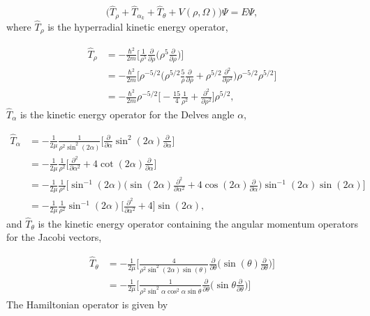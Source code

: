 \documentclass{article}
\begin{document}
\begin{equation}
\big(\hat{T}_{\rho} + \hat{T}_{\alpha_{k}} + \hat{T}_{\theta} + V(\rho,\Omega)\big) \Psi = E\Psi, 
\end{equation}
where $\hat{T}_{\rho}$ is the hyperradial kinetic energy operator,

\begin{align}
\hat{T}_{\rho} &= -\frac{\hbar^2}{2m} \Big[ \frac{1}{\rho^5}\frac{\partial}{\partial\rho} \Big( \rho^5 \frac{\partial}{\partial\rho} \Big)  \Big] \nonumber\\ 
&= -\frac{\hbar^2}{2m} \Big[ \rho^{-5/2} \Big( \rho^{5/2} \frac{5}{\rho} \frac{\partial}{\partial\rho} + \rho^{5/2} \frac{\partial^2}{\partial\rho^2} \Big) \rho^{-5/2} \rho^{5/2} \Big]\nonumber\\
&= -\frac{\hbar^2}{2m} \rho^{-5/2} \Big[  -\frac{15}{4} \frac{1}{\rho^2} + \frac{\partial^2}{\partial\rho^2} \Big] \rho^{5/2},
\end{align}
$\hat{T}_{\alpha}$ is the kinetic energy operator for the Delves angle $\alpha$,

\begin{align}
\hat{T}_{\alpha} &= -\frac{1}{2\mu}  \frac{1}{\rho^2 \sin^2(2\alpha)}  \bigg[ \frac{\partial}{\partial\alpha} \sin^2(2\alpha) \frac{\partial}{\partial\alpha} \bigg]\nonumber\\ 
&= -\frac{1}{2\mu} \frac{1}{\rho^2} \bigg[ \frac{\partial^2}{\partial\alpha^2} + 4\cot(2\alpha) \frac{\partial}{\partial\alpha} \bigg]\nonumber\\
&= -\frac{1}{2\mu} \frac{1}{\rho^2} \bigg[ \sin^{-1}(2\alpha) \bigg(\sin(2\alpha)\frac{\partial^2}{\partial\alpha^2} + 4\cos(2\alpha) \frac{\partial}{\partial\alpha} \bigg) \sin^{-1}(2\alpha) \sin(2\alpha) \bigg]\nonumber\\
&= -\frac{1}{2\mu} \frac{1}{\rho^2}\sin^{-1}(2\alpha) \bigg[ \frac{\partial^2}{\partial\alpha^2} + 4 \bigg] \sin(2\alpha),
\end{align} 
and $\hat{T}_{\theta}$ is the kinetic energy operator containing the angular momentum operators for the Jacobi vectors,

\begin{align}                  
\hat{T}_{\theta} &= -\frac{1}{2\mu} \bigg[ \frac{4}{\rho^2 \sin^2(2\alpha)\sin(\theta)} \frac{\partial}{\partial\theta} \bigg( \sin(\theta) \frac{\partial}{\partial\theta} \bigg) \bigg]\nonumber\\ 
                      	&= -\frac{1}{2\mu} \bigg[ \frac{1}{\rho^2 \sin^2\alpha\cos^2\alpha\sin\theta} \frac{\partial}{\partial\theta} \bigg( \sin\theta \frac{\partial}{\partial\theta} \bigg) \bigg]
\end{align}
The Hamiltonian operator is given by
\end{document}
